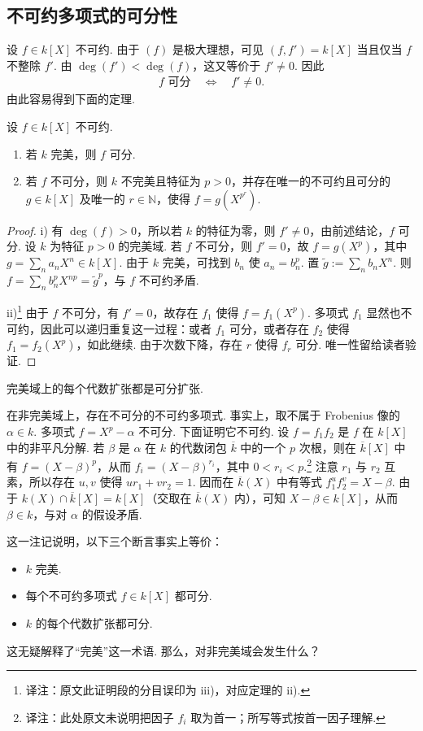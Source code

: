 \subsection{不可约多项式的可分性}\label{sec:galois-2-6-2}
设 $f\in k[X]$ 不可约. 由于 $(f)$ 是极大理想，可见 $(f,f')=k[X]$ 当且仅当 $f$ 不整除 $f'$. 由 $\deg(f')<\deg(f)$，这又等价于 $f'\ne0$. 因此
\begin{align*}
f\text{ 可分}\quad\Longleftrightarrow\quad f'\ne0.
\end{align*}
由此容易得到下面的定理.
\begin{theorem*}
设 $f\in k[X]$ 不可约.
\begin{enumerate}[label=\roman*)]
\item 若 $k$ 完美，则 $f$ 可分.
\item 若 $f$ 不可分，则 $k$ 不完美且特征为 $p>0$，并存在唯一的不可约且可分的 $g\in k[X]$ 及唯一的 $r\in\mathbb N$，使得 $f=g(X^{p^r})$.
\end{enumerate}
\end{theorem*}
\begin{proof}
i) 有 $\deg(f)>0$，所以若 $k$ 的特征为零，则 $f'\ne0$，由前述结论，$f$ 可分. 设 $k$ 为特征 $p>0$ 的完美域. 若 $f$ 不可分，则 $f'=0$，故 $f=g(X^p)$，其中 $g=\sum_na_nX^n\in k[X]$. 由于 $k$ 完美，可找到 $b_n$ 使 $a_n=b_n^p$. 置 $\widetilde g:=\sum_nb_nX^n$. 则 $f=\sum_nb_n^pX^{np}=\widetilde g^p$，与 $f$ 不可约矛盾.

ii)\footnote{译注：原文此证明段的分目误印为 iii)，对应定理的 ii).} 由于 $f$ 不可分，有 $f'=0$，故存在 $f_1$ 使得 $f=f_1(X^p)$. 多项式 $f_1$ 显然也不可约，因此可以递归重复这一过程：或者 $f_1$ 可分，或者存在 $f_2$ 使得 $f_1=f_2(X^p)$，如此继续. 由于次数下降，存在 $r$ 使得 $f_r$ 可分. 唯一性留给读者验证.
\end{proof}
\begin{corollary*}
完美域上的每个代数扩张都是可分扩张.
\end{corollary*}
\begin{remark*}
在非完美域上，存在不可分的不可约多项式. 事实上，取不属于 Frobenius 像的 $\alpha\in k$. 多项式 $f=X^p-\alpha$ 不可分. 下面证明它不可约. 设 $f=f_1f_2$ 是 $f$ 在 $k[X]$ 中的非平凡分解. 若 $\beta$ 是 $\alpha$ 在 $k$ 的代数闭包 $\overline k$ 中的一个 $p$ 次根，则在 $\overline k[X]$ 中有 $f=(X-\beta)^p$，从而 $f_i=(X-\beta)^{r_i}$，其中 $0<r_i<p$.\footnote{译注：此处原文未说明把因子 $f_i$ 取为首一；所写等式按首一因子理解.} 注意 $r_1$ 与 $r_2$ 互素，所以存在 $u,v$ 使得 $ur_1+vr_2=1$. 因而在 $\overline k(X)$ 中有等式 $f_1^uf_2^v=X-\beta$. 由于 $k(X)\cap\overline k[X]=k[X]$（交取在 $\overline k(X)$ 内），可知 $X-\beta\in k[X]$，从而 $\beta\in k$，与对 $\alpha$ 的假设矛盾.
\end{remark*}
这一注记说明，以下三个断言事实上等价：
\begin{itemize}
\item $k$ 完美.
\item 每个不可约多项式 $f\in k[X]$ 都可分.
\item $k$ 的每个代数扩张都可分.
\end{itemize}
这无疑解释了``完美''这一术语. 那么，对非完美域会发生什么？
